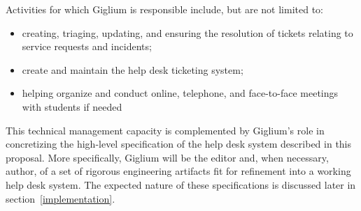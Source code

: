 Activities for which Giglium is responsible include, but are not limited to:
\begin{itemize}
	\item creating, triaging, updating, and ensuring the resolution of tickets relating to service requests and incidents;
	\item create and maintain the help desk ticketing system;
	\item helping organize and conduct online, telephone, and face-to-face meetings with students if needed
\end{itemize}
This technical management capacity is complemented by Giglium's role in concretizing the high-level specification of the help desk system described in this proposal. More specifically, Giglium will be the editor and, when necessary, author, of a set of rigorous engineering artifacts fit for refinement into a working help desk system. The expected nature
of these specifications is discussed later in section~\ref*{implementation}.

